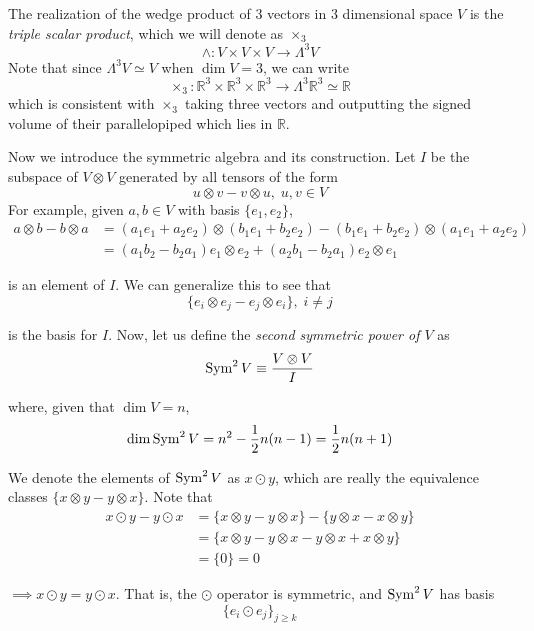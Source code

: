   \begin{example}
    The realization of the wedge product of 3 vectors in 3 dimensional space $V$ is the \textit{triple scalar product}, which we will denote as $\times_3$
    \[\wedge: V \times V \times V \longrightarrow \Lambda^3 V\]
    Note that since $\Lambda^3 V \simeq V$ when $\dim{V} = 3$, we can write 
    \[\times_3: \mathbb{R}^3 \times \mathbb{R}^3 \times \mathbb{R}^3 \longrightarrow \Lambda^3 \mathbb{R}^3 \simeq \mathbb{R}\]
    which is consistent with $\times_3$ taking three vectors and outputting the signed volume of their parallelopiped which lies in $\mathbb{R}$. 
  \end{example}

  Now we introduce the symmetric algebra and its construction. Let $I$ be the subspace of $V \otimes V$ generated by all tensors of the form 
  \[u \otimes v - v \otimes u, \; u, v \in V\]
  For example, given $a, b \in V$ with basis $\{e_1, e_2\}$, 
  \begin{align*}
    a \otimes b - b \otimes a & = (a_1 e_1 + a_2 e_2) \otimes (b_1 e_1 + b_2 e_2) - (b_1 e_1 + b_2 e_2) \otimes (a_1 e_1 + a_2 e_2) \\
    & = (a_1 b_2 - b_2 a_1) e_1 \otimes e_2 + (a_2 b_1 - b_2 a_1) e_2 \otimes e_1 
  \end{align*}

  is an element of $I$. We can generalize this to see that
  \[\{e_i \otimes e_j - e_j \otimes e_i\}, \; i \neq j\]

  is the basis for $I$. Now, let us define the \textit{second symmetric power of $V$} as 
  \[\operatorname{Sym}^2 V \equiv \frac{V \otimes V}{I}\]

  where, given that $\dim{V} = n$, 
  \[\dim{\operatorname{Sym}^2 V} = n^2 - \frac{1}{2} n (n-1) = \frac{1}{2} n (n+1)\]

  We denote the elements of $\operatorname{Sym}^2 V$ as $x \odot y$, which are really the equivalence classes $\{x \otimes y - y \otimes x\}$. Note that
  \begin{align*}
    x \odot y - y \odot x & = \{x \otimes y - y \otimes x\} - \{ y \otimes x - x \otimes y\} \\
    & = \{ x \otimes y - y \otimes x - y \otimes x + x \otimes y\} \\
    & = \{0\} = 0
  \end{align*}

  $\implies x \odot y = y \odot x$. That is, the $\odot$ operator is symmetric, and $\operatorname{Sym}^2 V$ has basis 
  \[ \{e_i \odot e_j\}_{j \geq k}\]

